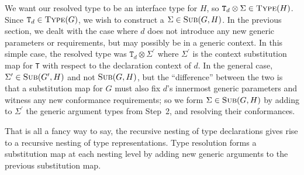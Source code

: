 \documentclass[../generics]{subfiles}
\begin{document}
We want our resolved type to be an interface type for $H$, so $\texttt{T}_d\otimes\Sigma\in\textsc{Type}({H})$. Since $\texttt{T}_d\in\textsc{Type}({G})$, we wish to construct a $\Sigma\in\textsc{Sub}({G, H})$. In the previous section, we dealt with the case where $d$ does not introduce any new generic parameters or requirements, but may possibly be in a generic context. In this simple case, the resolved type was $\texttt{T}_d\otimes\Sigma^\prime$ where  $\Sigma^\prime$ is the context substitution map for \texttt{T} with respect to the declaration context of $d$. In the general case, $\Sigma^\prime\in\textsc{Sub}({G^\prime, H})$ and not $\textsc{Sub}({G, H})$, but the ``difference'' between the two is that a substitution map for $G$ must also fix $d$'s innermost generic parameters and witness any new conformance requirements; so we form $\Sigma\in\textsc{Sub}({G, H})$ by adding to $\Sigma^\prime$ the generic argument types from Step~2, and resolving their conformances.

That is all a fancy way to say, the recursive nesting of type declarations gives rise to a recursive nesting of type representations. Type resolution forms a substitution map at each nesting level by adding new generic arguments to the previous substitution map.
\end{document}
